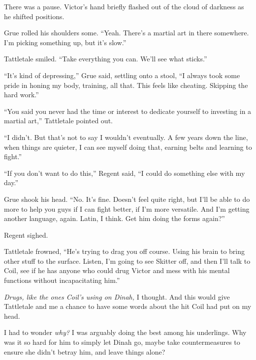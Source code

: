 There was a pause.  Victor's hand briefly flashed out of the cloud of darkness as he shifted positions.



Grue rolled his shoulders some.  ``Yeah.  There's a martial art in there somewhere.  I'm picking something up, but it's slow.''



Tattletale smiled.  ``Take everything you can.  We'll see what sticks.''



``It's kind of depressing,'' Grue said, settling onto a stool, ``I always took some pride in honing my body, training, all that.  This feels like cheating.  Skipping the hard work.''



``You said you never had the time or interest to dedicate yourself to investing in a martial art,'' Tattletale pointed out.



``I didn't.  But that's not to say I wouldn't eventually.  A few years down the line, when things are quieter, I can see myself doing that, earning belts and learning to fight.''



``If you don't want to do this,'' Regent said, ``I could do something else with my day.''



Grue shook his head.  ``No.  It's fine.  Doesn't feel quite right, but I'll be able to do more to help you guys if I can fight better, if I'm more versatile.  And I'm getting another language, again.  Latin, I think.  Get him doing the forms again?''



Regent sighed.



Tattletale frowned, ``He's trying to drag you off course.  Using his brain to bring other stuff to the surface.  Listen, I'm going to see Skitter off, and then I'll talk to Coil, see if he has anyone who could drug Victor and mess with his mental functions without incapacitating him.''



\emph{Drugs, like the ones Coil's using on Dinah, }I thought.  And this would give Tattletale and me a chance to have some words about the hit Coil had put on my head.



I had to wonder\emph{ why? } I was arguably doing the best among his underlings.  Why was it so hard for him to simply let Dinah go, maybe take countermeasures to ensure she didn't betray him, and leave things alone?



